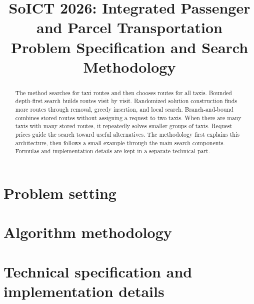 \documentclass[11pt,a4paper]{article}
\title{SoICT 2026: Integrated Passenger and Parcel Transportation\\
  \large Problem Specification and Search Methodology}
\date{}
\begin{document}
\maketitle

\begin{abstract}
The method searches for taxi routes and then chooses routes for all taxis.
Bounded depth-first search builds routes visit by visit. Randomized solution
construction finds more routes through removal, greedy insertion, and local
search. Branch-and-bound combines stored routes without assigning a request
to two taxis. When there are many taxis with many stored routes, it repeatedly solves
smaller groups of taxis. Request prices guide the search toward useful alternatives. The
methodology first explains this architecture, then follows a small example
through the main search components. Formulas and implementation details are
kept in a separate technical part.
\end{abstract}

\tableofcontents
\clearpage
\part{Problem setting}


\clearpage
\part{Algorithm methodology}
\label{part:methodology}


\clearpage
\appendix
\part{Technical specification and implementation details}
\label{part:technical}

\end{document}
